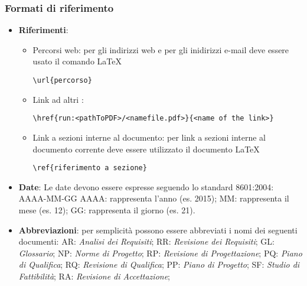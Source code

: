 \documentclass{scalatekids-article}
\begin{document}
\subsubsection{Formati di riferimento}
\begin{itemize}
\item \textbf{Riferimenti}:
  \begin{itemize}
  \item Percorsi web: per gli indirizzi web e per gli inidirizzi e-mail deve essere usato il comando \LaTeX\xspace
    \begin{center}
      \verb=\url{percorso}=
    \end{center}
  \item Link ad altri :
    \begin{center}
      \verb=\href{run:<pathToPDF>/<namefile.pdf>}{<name of the link>}=
    \end{center}
  \item Link a sezioni interne al documento: per link a sezioni interne al documento corrente deve essere utilizzato il documento \LaTeX\xspace
    \begin{center}
      \verb=\ref{riferimento a sezione}=
    \end{center}
  \end{itemize}
\item \textbf{Date}: Le date devono essere espresse seguendo lo standard \textit{} 8601:2004:
  AAAA-MM-GG
  AAAA: rappresenta l'anno (es. 2015);
  MM:	rappresenta il mese (es. 12);
  GG: rappresenta il giorno (es. 21).

\item \textbf{Abbreviazioni}: per semplicità possono essere abbreviati i nomi dei seguenti documenti:
  AR: \textit{Analisi dei Requisiti};
  RR: \textit{Revisione dei Requisiti};
  GL: \textit{Glossario};
  NP: \textit{Norme di Progetto};
  RP: \textit{Revisione di Progettazione};
  PQ: \textit{Piano di Qualifica};
  RQ: \textit{Revisione di Qualifica};
  PP: \textit{Piano di Progetto};
  SF: \textit{Studio di Fattibilità};
  RA: \textit{Revisione di Accettazione};


\end{itemize}
\end{document}
